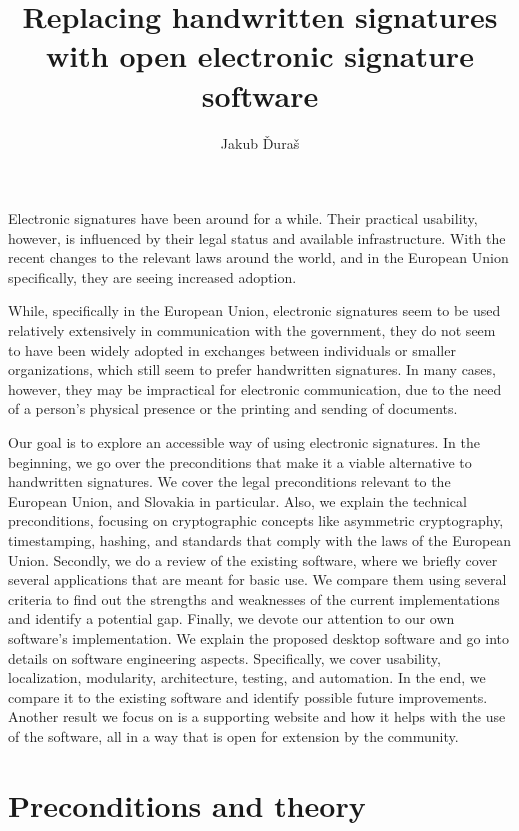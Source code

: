 \documentclass[thesismargins, english, thesislinespacing, onelinechapterstyle, upjsfrontpage]{rnthesis}
\title{Replacing handwritten signatures with open electronic signature software}
\author{Jakub Ďuraš}
\begin{document}
\maketitle

\newpage

\tableofcontents

\uvod

Electronic signatures have been around for a while.
Their practical usability, however, is influenced by their legal status and available infrastructure.
With the recent changes to the relevant laws around the world, and in the European Union specifically, they are seeing increased adoption.

While, specifically in the European Union, electronic signatures seem to be used relatively extensively in communication with the government, they do not seem to have been widely adopted in exchanges between individuals or smaller organizations, which still seem to prefer handwritten signatures.
In many cases, however, they may be impractical for electronic communication, due to the need of a person's physical presence or the printing and sending of documents.

Our goal is to explore an accessible way of using electronic signatures.
In the beginning, we go over the preconditions that make it a viable alternative to handwritten signatures.
We cover the legal preconditions relevant to the European Union, and Slovakia in particular.
Also, we explain the technical preconditions, focusing on cryptographic concepts like asymmetric cryptography, timestamping, hashing, and standards that comply with the laws of the European Union.
Secondly, we do a review of the existing software, where we briefly cover several applications that are meant for basic use.
We compare them using several criteria to find out the strengths and weaknesses of the current implementations and identify a potential gap.
Finally, we devote our attention to our own software's implementation.
We explain the proposed desktop software and go into details on software engineering aspects.
Specifically, we cover usability, localization, modularity, architecture, testing, and automation.
In the end, we compare it to the existing software and identify possible future improvements.
Another result we focus on is a supporting website and how it helps with the use of the software, all in a way that is open for extension by the community.

\chapter{Preconditions and theory}
\end{document}
